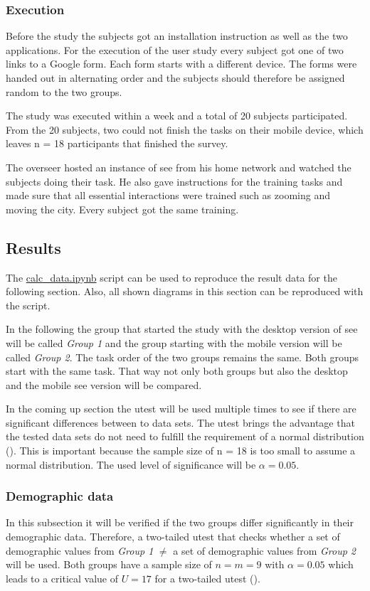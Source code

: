 \subsubsection{Execution}
Before the study the subjects got an installation instruction as well as the two applications.
For the execution of the user study every subject got one of two links to a Google form.
Each form starts with a different device. 
The forms were handed out in alternating order and the subjects should therefore be assigned random to the two groups.

The study was executed within a week and a total of 20 subjects participated.
From the 20 subjects, two could not finish the tasks on their mobile device, which leaves n = 18 participants that finished the survey.

The overseer hosted an instance of \gls{see} from his home network and watched the subjects doing their task.
He also gave instructions for the training tasks and made sure that all essential interactions were trained such as zooming and moving the \gls{city}.
Every subject got the same training.


\subsection{Results}
The \hyperref[calc]{calc\_data.ipynb} script can be used to reproduce the result data for the following section.
Also, all shown diagrams in this section can be reproduced with the script.

In the following the group that started the study with the desktop version of \gls{see} will be called \textit{Group 1} and the group starting with the mobile version will be called \textit{Group 2}.
The task order of the two groups remains the same.
Both groups start with the same task.
That way not only both groups but also the desktop and the mobile \gls{see} version will be compared. 

In the coming up section the \gls{utest} will be used multiple times to see if there are significant differences between to data sets.
The \gls{utest} brings the advantage that the tested data sets do not need to fulfill the requirement of a normal distribution (\cite{gibbons1991comparisons}).
This is important because the sample size of n = 18 is too small to assume a normal distribution.
The used level of significance will be $\alpha = 0.05$.

\label{results}
\subsubsection{Demographic data}
In this subsection it will be verified if the two groups differ significantly in their demographic data. 
Therefore, a two-tailed \gls{utest} that checks whether a set of demographic values from \textit{Group 1} $\neq$  a set of demographic values from \textit{Group 2} will be used.
Both groups have a sample size of $n = m = 9 $ with $\alpha = 0.05$ which leads to a critical value of $U = 17$ for a two-tailed \gls{utest} (\cite{zar2010biostatistical}).

